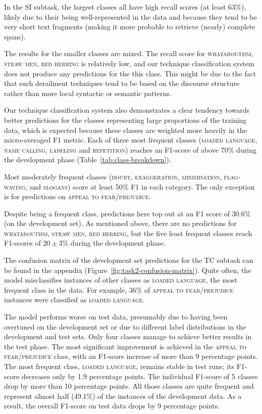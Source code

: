 \documentclass[11pt]{article}
\begin{document}
In the SI subtask,
the largest classes all have high recall scores (at least 63\%), likely due to their being well-represented in the data and because they tend to be very short text fragments (making it more probable to retrieve (nearly) complete spans).

The results for the smaller classes are mixed.
The recall score for \textsc{whataboutism, straw men, red herring} is relatively low,
and our technique classification system does not produce any predictions for the this class.
This might be due to the fact that such derailment techniques tend to be based on the discourse structure rather than more local syntactic or semantic patterns.


Our technique classification system also demonstrates a clear tendency towards better predictions for the classes representing large proportions of the training data,
which is expected because these classes are weighted more heavily in the micro-averaged F1 metric.
Each of three most frequent classes (\textsc{loaded language}, \textsc{name calling, labeling} and \textsc{repetition}) reaches an F1-score of above 70\% during the development phase (Table~\ref{tab:class-breakdown}). 

Most moderately frequent classes (\textsc{doubt}, \textsc{exaggeration, minimisation}, \textsc{flag-waving}, and \textsc{slogans}) score at least 50\% F1 in each category.
The only exception is for predictions on \textsc{appeal to fear/prejudice}.

Despite being a frequent class, predictions here top out at an F1 score of 30.6\% (on the development set).
As mentioned above, there are no predictions for \textsc{whataboutism, straw men, red herring}, but 
the five least frequent classes reach F1-scores of $20\pm3$\% during the development phase.

The confusion matrix of the development set predictions for the TC subtask can be found in the appendix (Figure~\ref{fig:task2-confusion-matrix}).
Quite often, the model misclassifies instances of other classes as \textsc{loaded language}, the most frequent class in the data.
For example, 36\% of \textsc{appeal to fear/prejudice} instances were classified as \textsc{loaded language}.


The model performs worse on test data, presumably due to having been overtuned on the development set or due to different label distributions in the development and test sets.
Only four classes manage to achieve better results in the test phase.
The most significant improvement is achieved in the \textsc{appeal to fear/prejudice} class, with an F1-score increase of more than 9 percentage points.
The most frequent class, \textsc{loaded language}, remains stable in test runs;
its F1-score decreases only by 1.9 percentage points.
The individual F1-score of 5 classes drop by more than 10 percentage points.
All those classes are quite frequent and represent almost half (49.1\%) of the instances of the development data.
As a result, the overall F1-score on test data drops by 9 percentage points.
\end{document}
